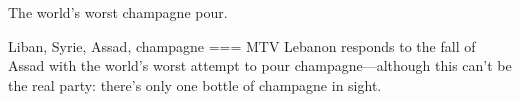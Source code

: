 The world’s worst champagne pour.

Liban, Syrie, Assad, champagne
===
MTV Lebanon responds to the fall of Assad with the world’s worst attempt to pour champagne—although this can’t be the real party: there’s only one bottle of champagne in sight.

\nocite{2024g}